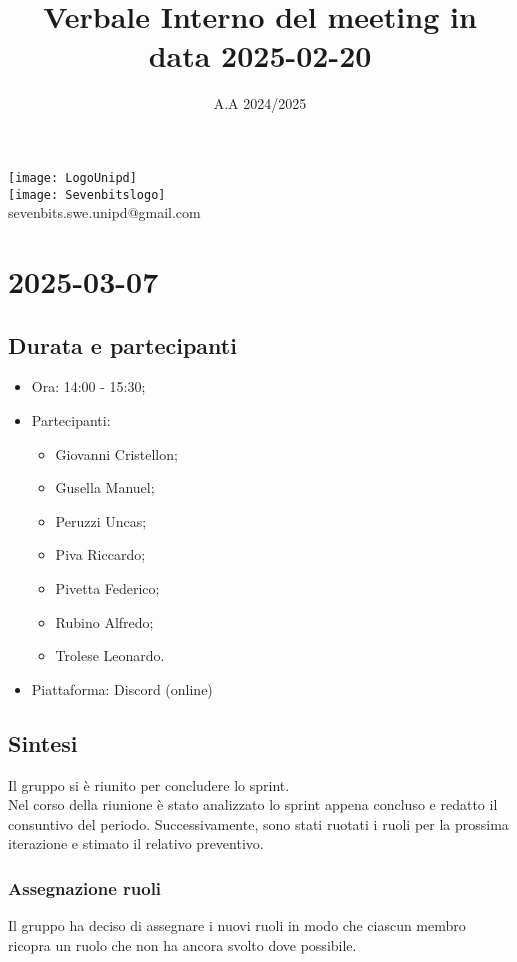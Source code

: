 \documentclass[10pt]{article}
\title{Verbale Interno del meeting in data 2025-02-20}
\date{A.A 2024/2025}
\begin{document}
\maketitle
\begin{center}
\texttt{[image: LogoUnipd]}\\
\texttt{[image: Sevenbitslogo]}\\
sevenbits.swe.unipd@gmail.com\\
\vspace{2mm}
\end{center}
\newpage
\tableofcontents
\newpage
\section{2025-03-07}
\subsection{Durata e partecipanti}
\begin{itemize}
\item Ora: 14:00 - 15:30;
\item Partecipanti:
	\begin{itemize}
    	\item Giovanni Cristellon;
		\item Gusella Manuel;
		\item Peruzzi Uncas;
		\item Piva Riccardo;
		\item Pivetta Federico;
		\item Rubino Alfredo;
		\item Trolese Leonardo.
	\end{itemize}
\item Piattaforma: Discord (online)
\end{itemize}

\subsection{Sintesi}
Il gruppo si è riunito per concludere lo sprint.\\
Nel corso della riunione è stato analizzato lo sprint appena concluso e redatto il consuntivo del periodo. Successivamente, sono stati ruotati i ruoli per la prossima iterazione e stimato il relativo preventivo.

\subsubsection{Assegnazione ruoli}
Il gruppo ha deciso di assegnare i nuovi ruoli in modo che ciascun membro ricopra un ruolo che non ha ancora svolto dove possibile.
\end{document}
